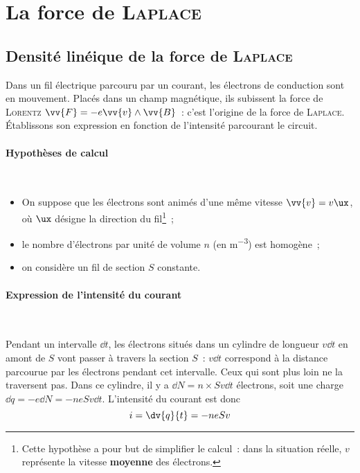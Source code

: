 \documentclass[../main/main.tex]{subfiles}
\begin{document}
\section{La force de \textsc{Laplace}}
\label{sec:flpl}
\subsection{Densité linéique de la force de \textsc{Laplace}}
\label{ssec:flplliq}
Dans un fil électrique parcouru par un courant, les électrons de conduction sont
en mouvement. Placés dans un champ magnétique, ils subissent la force de
\textsc{Lorentz} $\vv{F} = -e \vv{v}\wedge \vv{B}$~: c'est l'origine de la force
de \textsc{Laplace}. Établissons son expression en fonction de l'intensité
parcourant le circuit.

\paragraph*{Hypothèses de calcul}~
\begin{hide}
    \begin{itemize}[label=$\diamond$, leftmargin=10pt]
    \item On suppose que les électrons sont animés d'une même vitesse $\vv{v} =
      v \ux$, où $\ux$ désigne la direction du fil\footnote{Cette hypothèse a pour
      but de simplifier le calcul~: dans la situation réelle, $v$ représente la
    vitesse \textbf{moyenne} des électrons.}~;
    \item le nombre d'électrons par unité de volume $n$ (en \si{m^{-3}}) est
      homogène~;
    \item on considère un fil de section $S$ constante.
  \end{itemize}
\end{hide}

\paragraph*{Expression de l'intensité du courant}~
\begin{hide}
  Pendant un intervalle $\dd{t}$, les électrons situés dans un cylindre de
  longueur $v \dd{t}$ en amont de $S$ vont passer à travers la section $S$~: $v
  \dd{t}$ correspond à la distance parcourue par les électrons pendant cet
  intervalle. Ceux qui sont plus loin ne la traversent pas. Dans ce cylindre, il y
  a $\dd{N} = n\times Sv \dd{t}$ électrons, soit une charge $\dd{q} = -e \dd{N} =
  -neSv \dd{t}$. L'intensité du courant est donc
  \[
    i = \dv{q}{t} = -neSv
  \]
\end{hide}
\end{document}
